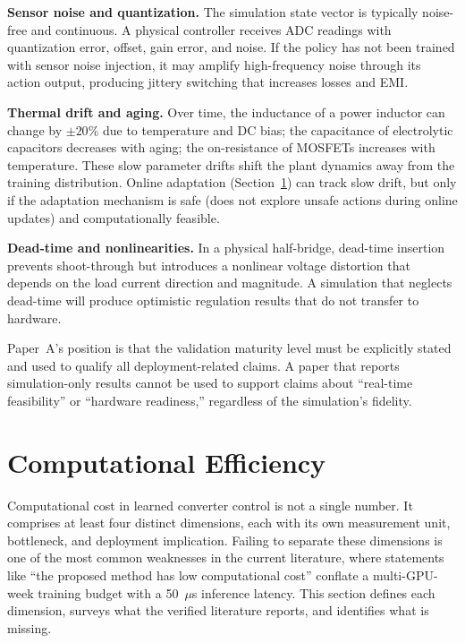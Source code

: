 \documentclass[manuscript,screen,review]{acmart}
\begin{document}
\textbf{Sensor noise and quantization.}
The simulation state vector is typically noise-free and continuous.
A physical controller receives ADC readings with quantization error, offset, gain error, and noise.
If the policy has not been trained with sensor noise injection, it may amplify high-frequency noise through its action output, producing jittery switching that increases losses and EMI.

\textbf{Thermal drift and aging.}
Over time, the inductance of a power inductor can change by $\pm 20\%$ due to temperature and DC bias; the capacitance of electrolytic capacitors decreases with aging; the on-resistance of MOSFETs increases with temperature.
These slow parameter drifts shift the plant dynamics away from the training distribution.
Online adaptation (Section~\ref{sec:computation}) can track slow drift, but only if the adaptation mechanism is safe (does not explore unsafe actions during online updates) and computationally feasible.

\textbf{Dead-time and nonlinearities.}
In a physical half-bridge, dead-time insertion prevents shoot-through but introduces a nonlinear voltage distortion that depends on the load current direction and magnitude.
A simulation that neglects dead-time will produce optimistic regulation results that do not transfer to hardware.

Paper~A's position is that the validation maturity level must be explicitly stated and used to qualify all deployment-related claims.
A paper that reports simulation-only results cannot be used to support claims about ``real-time feasibility'' or ``hardware readiness,'' regardless of the simulation's fidelity.

\section{Computational Efficiency}
\label{sec:computation}

Computational cost in learned converter control is not a single number.
It comprises at least four distinct dimensions, each with its own measurement unit, bottleneck, and deployment implication.
Failing to separate these dimensions is one of the most common weaknesses in the current literature, where statements like ``the proposed method has low computational cost'' conflate a multi-GPU-week training budget with a 50~$\mu$s inference latency.
This section defines each dimension, surveys what the verified literature reports, and identifies what is missing.
\end{document}
